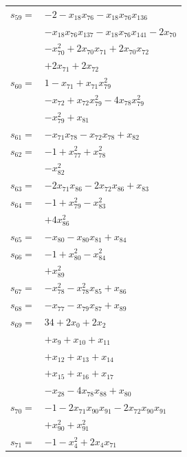 \begin{longtable}{@{}r@{\;}l@{}}
\(s_{59}=\) & \(\displaystyle -2 -x_{18}x_{76} -x_{18}x_{76}x_{136}\) \\
 & \(\displaystyle -x_{18}x_{76}x_{137} -x_{18}x_{76}x_{141} -2x_{70}\) \\
 & \(\displaystyle -x_{70}^{2} +2x_{70}x_{71} +2x_{70}x_{72}\) \\
 & \(\displaystyle +2x_{71} +2x_{72}\) \\[3pt]
\(s_{60}=\) & \(\displaystyle 1 -x_{71} +x_{71}x_{79}^{2}\) \\
 & \(\displaystyle -x_{72} +x_{72}x_{79}^{2} -4x_{78}x_{79}^{2}\) \\
 & \(\displaystyle -x_{79}^{2} +x_{81}\) \\[3pt]
\(s_{61}=\) & \(\displaystyle -x_{71}x_{78} -x_{72}x_{78} +x_{82}\) \\[3pt]
\(s_{62}=\) & \(\displaystyle -1 +x_{77}^{2} +x_{78}^{2}\) \\
 & \(\displaystyle -x_{82}^{2}\) \\[3pt]
\(s_{63}=\) & \(\displaystyle -2x_{71}x_{86} -2x_{72}x_{86} +x_{83}\) \\[3pt]
\(s_{64}=\) & \(\displaystyle -1 +x_{79}^{2} -x_{83}^{2}\) \\
 & \(\displaystyle +4x_{86}^{2}\) \\[3pt]
\(s_{65}=\) & \(\displaystyle -x_{80} -x_{80}x_{81} +x_{84}\) \\[3pt]
\(s_{66}=\) & \(\displaystyle -1 +x_{80}^{2} -x_{84}^{2}\) \\
 & \(\displaystyle +x_{89}^{2}\) \\[3pt]
\(s_{67}=\) & \(\displaystyle -x_{78}^{2} -x_{78}^{2}x_{85} +x_{86}\) \\[3pt]
\(s_{68}=\) & \(\displaystyle -x_{77} -x_{79}x_{87} +x_{89}\) \\[3pt]
\(s_{69}=\) & \(\displaystyle 34 +2x_{0} +2x_{2}\) \\
 & \(\displaystyle +x_{9} +x_{10} +x_{11}\) \\
 & \(\displaystyle +x_{12} +x_{13} +x_{14}\) \\
 & \(\displaystyle +x_{15} +x_{16} +x_{17}\) \\
 & \(\displaystyle -x_{28} -4x_{78}x_{88} +x_{80}\) \\[3pt]
\(s_{70}=\) & \(\displaystyle -1 -2x_{71}x_{90}x_{91} -2x_{72}x_{90}x_{91}\) \\
 & \(\displaystyle +x_{90}^{2} +x_{91}^{2}\) \\[3pt]
\(s_{71}=\) & \(\displaystyle -1 -x_{4}^{2} +2x_{4}x_{71}\) \\

\end{longtable}
